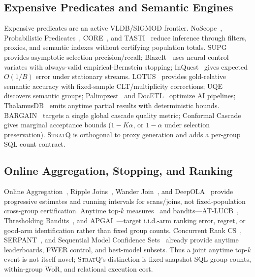 \subsection{Expensive Predicates and Semantic Engines}
Expensive predicates are an active VLDB/SIGMOD frontier. NoScope~\cite{kang2017noscope}, Probabilistic Predicates~\cite{lu2018pp}, CORE~\cite{yang2022core}, and TASTI~\cite{kang2022tasti} reduce inference through filters, proxies, and semantic indexes without certifying population totals. SUPG~\cite{kang2020supg} provides asymptotic selection precision/recall; BlazeIt~\cite{kang2019blazeit} uses neural control variates with always-valid empirical-Bernstein stopping; InQuest~\cite{russo2023inquest} gives expected $O(1/B)$ error under stationary streams.
LOTUS~\cite{patel2025lotus} provides gold-relative semantic accuracy with fixed-sample CLT/multiplicity corrections; UQE~\cite{dai2024uqe} discovers semantic groups; Palimpzest~\cite{liu2025palimpzest} and DocETL~\cite{shankar2025docetl} optimize AI pipelines; ThalamusDB~\cite{jo2024thalamusdb} emits anytime partial results with deterministic bounds. BARGAIN~\cite{zeighami2026bargain} targets a single global cascade quality metric; Conformal Cascade~\cite{dou2026conformalcascade} gives marginal acceptance bounds ($1-K\alpha$, or $1-\alpha$ under selection preservation). \textsc{StratQ} is orthogonal to proxy generation and adds a per-group SQL count contract.

\subsection{Online Aggregation, Stopping, and Ranking}
Online Aggregation~\cite{hellerstein1997online}, Ripple Joins~\cite{haas1999ripple}, Wander Join~\cite{li2016wander}, and DeepOLA~\cite{sheoran2023deepola} provide progressive estimates and running intervals for scans/joins, not fixed-population cross-group certification. Anytime top-$k$ measures~\cite{arai2009anytimetopk} and bandits---AT-LUCB~\cite{jun2016atlucb}, Thresholding Bandits~\cite{tao2019threshold}, and APGAI~\cite{jourdan2026apgai}---target i.i.d.-arm ranking error, regret, or good-arm identification rather than fixed group counts.
Concurrent Rank CS~\cite{khosravi2026rankcs}, SERPANT~\cite{gu2026serpant}, and Sequential Model Confidence Sets~\cite{arnold2026smcs} already provide anytime leaderboards, FWER control, and best-model subsets. Thus a joint anytime top-$k$ event is not itself novel; \textsc{StratQ}'s distinction is fixed-snapshot SQL group counts, within-group WoR, and relational execution cost.

